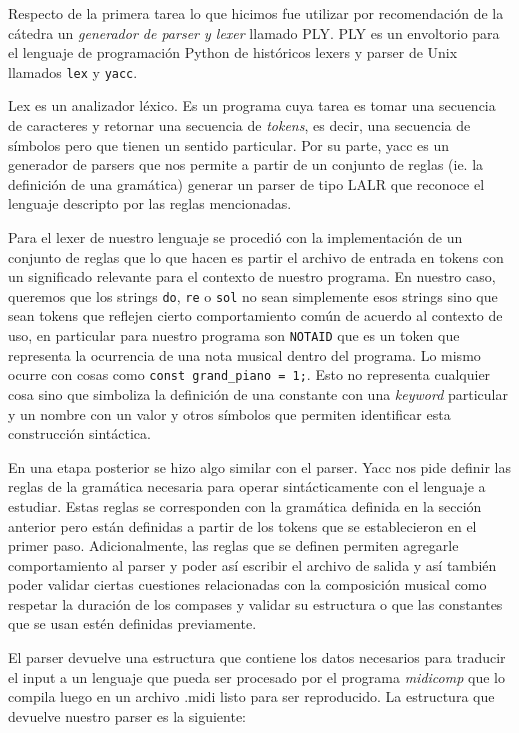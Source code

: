 Respecto de la primera tarea lo que hicimos fue utilizar por recomendación de la cátedra un \emph{generador de parser y lexer} llamado
PLY. PLY es un envoltorio para el lenguaje de programación Python de históricos lexers y parser de Unix llamados \texttt{lex} y \texttt{yacc}.

Lex es un analizador léxico. Es un programa cuya tarea es tomar una secuencia de caracteres y retornar una secuencia de \emph{tokens}, es decir,
una secuencia de símbolos pero que tienen un sentido particular. Por su parte, yacc es un generador de parsers que nos permite a partir de un
conjunto de reglas (ie. la definición de una gramática) generar un parser de tipo LALR que reconoce el lenguaje descripto por las reglas mencionadas.

Para el lexer de nuestro lenguaje se procedió con la implementación de un conjunto de reglas que lo que hacen es partir el archivo de entrada
en tokens con un significado relevante para el contexto de nuestro programa. En nuestro caso, queremos que los strings \texttt{do}, \texttt{re} o
\texttt{sol} no sean simplemente esos strings sino que sean tokens que reflejen cierto comportamiento común de acuerdo al contexto de uso, en particular
para nuestro programa son \texttt{NOTAID} que es un token que representa la ocurrencia de una nota musical dentro del programa. Lo mismo ocurre
con cosas como \texttt{const grand\_piano = 1;}. Esto no representa cualquier cosa sino que simboliza la definición de una constante con una
\emph{keyword} particular y un nombre con un valor y otros símbolos que permiten identificar esta construcción sintáctica.

En una etapa posterior se hizo algo similar con el parser. Yacc nos pide definir las reglas de la gramática necesaria para operar
sintácticamente con el lenguaje a estudiar. Estas reglas se corresponden con la gramática definida en la sección anterior pero están
definidas a partir de los tokens que se establecieron en el primer paso. Adicionalmente, las reglas que se definen permiten agregarle comportamiento 
al parser y poder así escribir el archivo de salida y así también poder validar ciertas cuestiones relacionadas con la composición musical
como respetar la duración de los compases y validar su estructura o que las constantes que se usan estén definidas previamente.

El parser devuelve una estructura que contiene los datos necesarios para traducir el input a un lenguaje que pueda ser procesado por el programa \textit{midicomp} que lo compila luego en un archivo .midi listo para ser reproducido. La estructura que devuelve nuestro parser es la siguiente:

